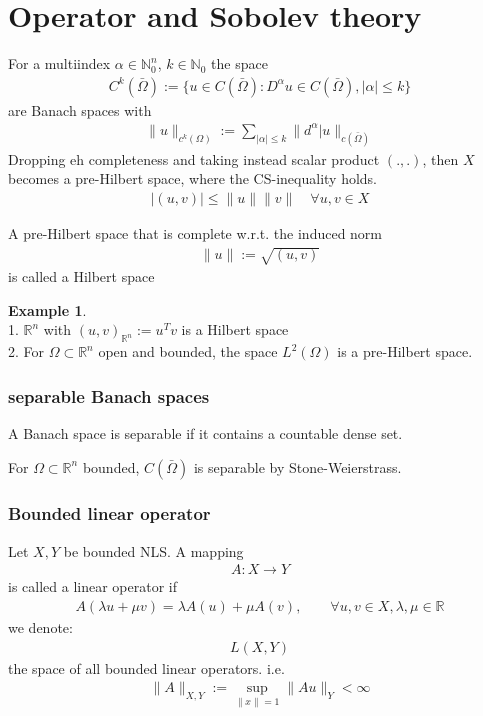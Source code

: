 \documentclass[a4paper,11pt,fleqn]{book}
\theoremstyle{definition}
\newtheorem*{example}{Example}
\theoremstyle{remark}
\begin{document}
\section{Operator and Sobolev theory}
For a multiindex $\alpha \in \mathbb{N}_0^n$, $k \in \mathbb{N}_0$ the space
\begin{align*}
	C^k(\bar{\Omega}) := \{ u \in C(\bar{\Omega}): D^\alpha u \in C(\bar{\Omega}), |\alpha| \le k\}
\end{align*}
are Banach spaces with 
\begin{align*}
	\|u\|_{c^k(\Omega)}:= \sum_{|\alpha| \le k} \|d^\alpha|u\|_{c(\bar{\Omega})}
\end{align*}
Dropping eh completeness and taking instead scalar product $(., .)$, then $X$ becomes a pre-Hilbert space, where the CS-inequality holds. 
\begin{align*}
	|(u, v)| \le \|u\| \|v\| \quad \forall u, v \in X
\end{align*}

A pre-Hilbert space that is complete w.r.t. the induced norm
\begin{align*}
	\|u\|:= \sqrt{(u, v)}
\end{align*}
is called a Hilbert space

\begin{example}\quad\\
	1. $\mathbb{R}^n$ with $(u, v)_{\mathbb{R}^n}:= u^T v$ is a Hilbert space\\
	2. For $\Omega \subset \mathbb{R}^n$ open and bounded, the space $L^2(\Omega)$ is a pre-Hilbert space. 
\end{example}

\subsubsection*{separable Banach spaces}
A Banach space is separable if it contains a countable dense set. 

\example
For $\Omega \subset \mathbb{R}^n$ bounded, $C(\bar{\Omega})$ is separable by Stone-Weierstrass. 

\subsubsection*{Bounded linear operator}
Let $X, Y$ be bounded NLS. A mapping 
\begin{align*}
	A: X \rightarrow Y
\end{align*}
is called a linear operator if 
\begin{align*}
	A(\lambda u + \mu v) = \lambda A(u) + \mu A(v), \qquad \forall u, v \in X, \lambda, \mu \in \mathbb{R}
\end{align*}
we denote:
\begin{align*}
	L(X,Y) 
\end{align*}
the space of all bounded linear operators. i.e.
\begin{align*}
	\|A\|_{X, Y}:= \sup_{\|x\| = 1} \|Au\|_Y < \infty
\end{align*}
\end{document}
